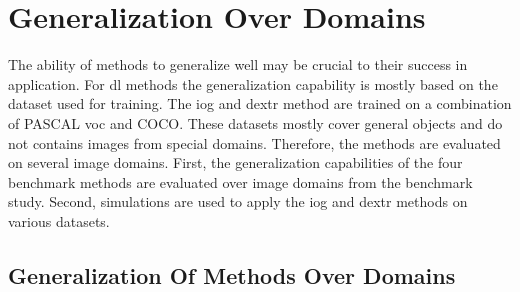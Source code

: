 
\section{Generalization Over Domains} \label{ord:ch5:sec2_generalization_domains}

The ability of methods to generalize well may be crucial to their success in application.
For \gls{dl} methods the generalization capability is mostly based on the dataset used for training.
The \gls{iog} and \gls{dextr} method are trained on a combination of PASCAL \gls{voc} and COCO.
These datasets mostly cover general objects and do not contains images from special domains.
Therefore, the methods are evaluated on several image domains.
First, the generalization capabilities of the four benchmark methods are evaluated over image domains from the benchmark study.
Second, simulations are used to apply the \gls{iog} and \gls{dextr} methods on various datasets.

\subsection{Generalization Of Methods Over Domains}

